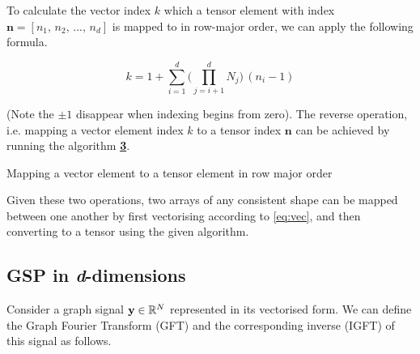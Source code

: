 To calculate the vector index $k$ which a tensor element with index $\mathbf{n} = [n_1,\, n_2,\, ...,\, n_d]$ is mapped to in row-major order, we can apply the following formula.  

\begin{equation}
    \label{eq:vec}
    k = 1 + \sum_{i=1}^d \Big( \prod_{j=i+1}^d N_j \Big) \, (n_i - 1)
\end{equation}

(Note the $\pm1$ disappear when indexing begins from zero). The reverse operation, i.e. mapping a vector element index $k$ to a tensor index $\mathbf{n}$ can be achieved by running the algorithm \hyperlink{vectoten}{\textbf{3}}. 


\begin{algorithm}[t]
    \hypertarget{vectoten}{}
    \label{al:vectoten}
    \caption{Mapping a vector element to a tensor element in row major order}
    \begin{algorithmic}
    \vspace{0.15cm}
    \vspace{0.1cm}
    \vspace{0.25cm}
    \vspace{0.25cm}
    \vspace{0.25cm}
    \vspace{0.15cm}
    \vspace{0.15cm}
    \EndFor
    \vspace{0.25cm}
    \end{algorithmic}
\end{algorithm}



Given these two operations, two arrays of any consistent shape can be mapped between one another by first vectorising according to \cref{eq:vec}, and then converting to a tensor using the given algorithm.



\subsection{GSP in \textit{d}-dimensions}



Consider a graph signal $\mathbf{y} \in \mathbb{R}^N$ represented in its vectorised form. We can define the Graph Fourier Transform (GFT) and the corresponding inverse (IGFT) of this signal as follows. 

